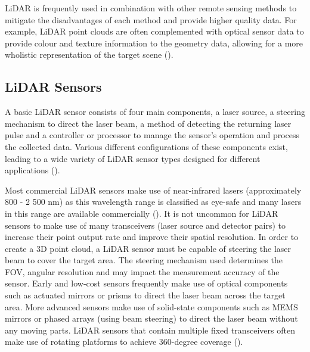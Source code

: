 \ac{LiDAR} is frequently used in combination with other remote sensing methods to mitigate the disadvantages of each method and provide higher quality data. For example, \ac{LiDAR} point clouds are often complemented with optical sensor data to provide colour and texture information to the geometry data, allowing for a more wholistic representation of the target scene (\cite{wangEvolutionLiDARIts2020}).

\subsection{LiDAR Sensors}
\label{subsec:ch3.section1.subsec1}

A basic \ac{LiDAR} sensor consists of four main components, a laser source, a steering mechanism to direct the laser beam, a method of detecting the returning laser pulse and a controller or processor to manage the sensor's operation and process the collected data. Various different configurations of these components exist, leading to a wide variety of \ac{LiDAR} sensor types designed for different applications (\cite{rajSurveyLiDARScanning2020}). 

Most commercial \ac{LiDAR} sensors make use of near-infrared lasers (approximately 800 - 2 500 nm) as this wavelength range is classified as eye-safe and many lasers in this range are available commercially (\cite{molebnyLaserRadarHistorical2016}). It is not uncommon for \ac{LiDAR} sensors to make use of many transceivers (laser source and detector pairs) to increase their point output rate and improve their spatial resolution.
In order to create a 3D point cloud, a \ac{LiDAR} sensor must be capable of steering the laser beam to cover the target area. The steering mechanism used determines the \ac{FOV}, angular resolution and may impact the measurement accuracy of the sensor. Early and low-cost sensors frequently make use of optical components such as actuated mirrors or prisms to direct the laser beam across the target area. More advanced sensors make use of solid-state components such as \ac{MEMS} mirrors or phased arrays (using beam steering) to direct the laser beam without any moving parts. \ac{LiDAR} sensors that contain multiple fixed transceivers often make use of rotating platforms to achieve 360-degree coverage (\cite{rajSurveyLiDARScanning2020}). 

